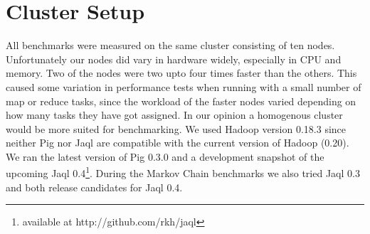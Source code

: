 \section{Cluster Setup}

All benchmarks were measured on the same cluster consisting of ten nodes. Unfortunately our nodes did vary in hardware widely, especially in CPU and memory. Two of the nodes were two upto four times faster than the others. This caused some variation in performance tests when running with a small number of map or reduce tasks, since the workload of the faster nodes varied depending on how many tasks they have got assigned. In our opinion a homogenous cluster would be more suited for benchmarking. We used Hadoop version 0.18.3 since neither Pig nor Jaql are compatible with the current version of Hadoop (0.20). We ran the latest version of Pig 0.3.0 and a development snapshot of the upcoming Jaql 0.4\footnote{available at http://github.com/rkh/jaql}. During the Markov Chain benchmarks we also tried Jaql 0.3 and both release candidates for Jaql 0.4.
